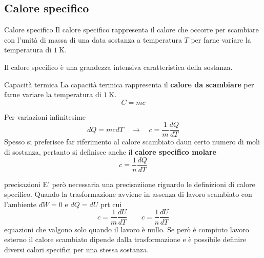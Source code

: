 \documentclass[x11names]{report}
\begin{document}
	\subsection{Calore specifico}
	\begin{center}
		\colorbox{yblue}{\begin{minipage}{5.75in}
				\begin{blues}{Calore specifico}
					Il calore specifico rappresenta il calore che occorre per scambiare con l'unità di massa di una data sostanza a temperatura \(T\) per farne variare la temperatura di \(\SI{1}{\kelvin}\).
					
					Il calore specifico è una grandezza intensiva caratteristica della sostanza.
				\end{blues}
		\end{minipage}}
	\end{center}
	\begin{center}
		\colorbox{yblue}{\begin{minipage}{5.75in}
				\begin{blues}{Capacità termica}
					La capacità termica rappresenta il \textbf{calore da scambiare}  per farne variare la temperatura di \(\SI{1}{\kelvin}\).
					\[ 
					C = mc
					\]
				\end{blues}
		\end{minipage}}
	\end{center}
	Per variazioni infinitesime
	\[ 
	dQ  =mc dT \quad \to \quad c = \frac{1}{m}\frac{dQ}{dT}
	\]
	Spesso si preferisce far riferimento al calore scambiato daun certo numero di moli di sostanza, pertanto si definisce   anche il \textbf{calore specifico molare}
	\[ 
	c = \frac{1}{n}\frac{dQ}{dT}
	\]
	\begin{es}{precisazioni}
		E' però necessaria una precisaziione riguardo le definizioni di calore specifico. Quando la trasformazione avviene in assenza di lavoro scambiato con l'ambiente \(dW = 0\) e \(dQ = dU\) prt cui
		\begin{equation}
			c  = \frac{1}{m}\frac{dU}{dT} \qquad c  = \frac{1}{n}\frac{dU}{dT}
		\end{equation}
		equazioni che valgono solo quando il lavoro è nullo. Se però è compiuto lavoro esterno il calore scambiato dipende dalla trasformazione e è possibile definire diversi calori specifici per una stessa sostanza.
	\end{es}
\end{document}
